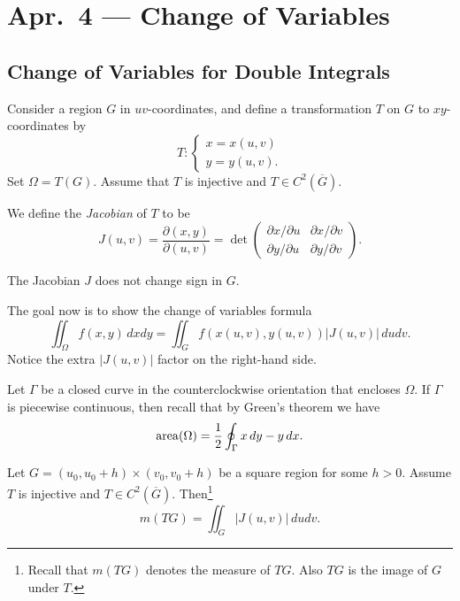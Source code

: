 \chapter{Apr.~4 --- Change of Variables}

\section{Change of Variables for Double Integrals}
Consider a region $G$ in $uv$-coordinates, and define
a transformation $T$ on $G$ to $xy$-coordinates by
\[
  T :
  \begin{cases}
    x = x(u,v) \\
    y = y(u,v).
  \end{cases}
\]
Set $\Omega = T(G)$. Assume that $T$ is injective
and $T \in C^2(\overline{G})$.

\begin{definition}
  We define the \emph{Jacobian} of $T$ to be
  \[
    J(u, v) = \frac{\partial(x, y)}{\partial(u, v)}
    = \det
    \begin{pmatrix}
      \partial x / \partial u & \partial x / \partial v \\
      \partial y / \partial u & \partial y / \partial v
    \end{pmatrix}.
  \]
\end{definition}

\begin{remark}
  The Jacobian $J$ does not change sign in $G$.
\end{remark}

The goal now is to show the change of variables formula
\[
  \iint_{\Omega} f(x, y)\, dxdy
  = \iint_G f(x(u, v), y(u, v)) |J(u, v)|\, dudv.
\]
Notice the extra $|J(u, v)|$ factor on the right-hand side.

\begin{remark}
  Let $\Gamma$ be a closed curve in the counterclockwise
  orientation that encloses $\Omega$. If $\Gamma$ is
  piecewise continuous, then recall that
  by Green's theorem we have
  \[
    \operatorname{area}(\Omega) = \frac{1}{2} \oint_{\Gamma} x\, dy - y\, dx.
  \]
\end{remark}

\begin{lemma}
  Let $G = (u_0, u_0 + h) \times (v_0, v_0 + h)$ be a
  square region for some $h > 0$. Assume $T$ is
  injective and $T \in C^2(\overline{G})$. Then\footnote{Recall that $m(TG)$ denotes the measure of $TG$. Also $TG$ is the image of $G$ under $T$.}
  \[
    m(TG) = \iint_G |J(u, v)|\, dudv.
  \]
\end{lemma}

